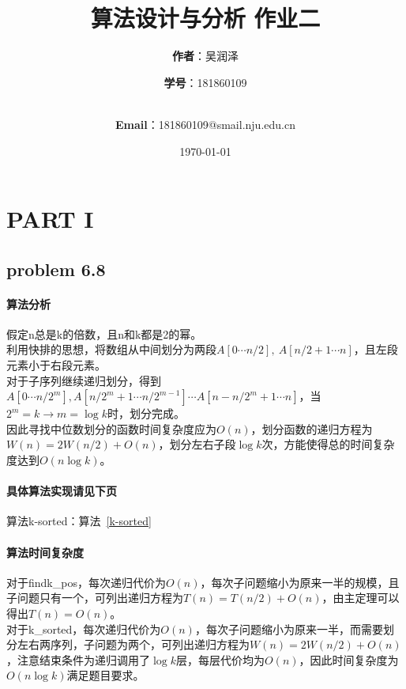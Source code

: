 \documentclass[11pt]{ctexart}
\title{\Huge\textbf{算法设计与分析 作业二}\\}
\author{\Large\textbf{作者}：吴润泽 \and{\Large\textbf{学号}：181860109}\\
	\\
	\and {\Large\textbf{Email}：181860109@smail.nju.edu.cn}\\}
\date{\Large\today}
\begin{document}
	\maketitle

	\tableofcontents
		\newpage
	\section*{PART I}
	\subsection*{problem 6.8}
		
	\paragraph{算法分析}假定n总是k的倍数，且n和k都是2的幂。\\
	\hspace*{20pt}利用快排的思想，将数组从中间划分为两段$A[0\cdots n/2],\ A[n/2+1\cdots n]$，且左段元素小于右段元素。\\
	\hspace*{20pt}对于子序列继续递归划分，得到$A[0\cdots n/2^m],A[n/2^m+1\cdots n/2^{m-1}]\cdots A[n-n/2^m+1\cdots n]$，当$2^m=k\rightarrow m=\log k$时，划分完成。\\
	\hspace*{20pt}因此寻找中位数划分的函数时间复杂度应为$O(n)$，划分函数的递归方程为$W(n)=2W(n/2)+O(n)$，划分左右子段$\log k$次，方能使得总的时间复杂度达到$O(n\log k)$。
	\paragraph{具体算法实现请见下页}算法k-sorted：算法~\ref{k-sorted}
	\paragraph{算法时间复杂度}
	对于findk\_pos，每次递归代价为$O(n)$，每次子问题缩小为原来一半的规模，且子问题只有一个，可列出递归方程为$T(n)=T(n/2)+O(n)$，由主定理可以得出$T(n)=O(n)$。\\
	\hspace*{20pt}对于k\_sorted，每次递归代价为$O(n)$，每次子问题缩小为原来一半，而需要划分左右两序列，子问题为两个，可列出递归方程为$W(n)=2W(n/2)+O(n)$，注意结束条件为递归调用了$\log k$层，每层代价均为$O(n)$，因此时间复杂度为$O(n\log k)$满足题目要求。
	
\end{document}
